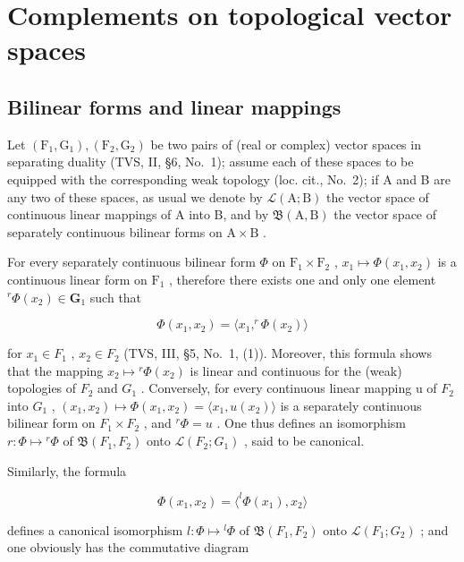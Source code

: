 \appendix
\chapter{Complements on topological vector spaces}

\section{Bilinear forms and linear mappings}

Let \((\mathrm{F}_{1},\mathrm{G}_{1}),(\mathrm{F}_{2},\mathrm{G}_{2})\) be two pairs of (real or complex) vector spaces in separating duality (TVS, II, §6, No.~1); assume each of these spaces to be equipped with the corresponding weak topology (loc. cit., No.~2); if A and B are any two of these spaces, as usual we denote by \(\mathcal{L}(\mathrm{A};\mathrm{B})\) the vector space of continuous linear mappings of A into B, and by \(\mathfrak{B}(\mathrm{A},\mathrm{B})\) the vector space of separately continuous bilinear forms on \(\mathrm{A}\times \mathrm{B}\) .

For every separately continuous bilinear form \(\Phi\) on \(\mathrm{F}_1\times \mathrm{F}_2\) , \(x_{1}\mapsto \Phi (x_{1},x_{2})\) is a continuous linear form on \(\mathrm{F}_1\) , therefore there exists one and only one element \(^r\Phi (x_2)\in \mathbf{G}_1\) such that

\[
\Phi (x _ {1}, x _ {2}) = \langle x _ {1}, ^ {r} \Phi (x _ {2}) \rangle\tag{1}
\]

for \(x_{1} \in F_{1}\) , \(x_{2} \in F_{2}\) (TVS, III, §5, No.~1, (1)). Moreover, this formula shows that the mapping \(x_{2} \mapsto {}^{r}\Phi(x_{2})\) is linear and continuous for the (weak) topologies of \(F_{2}\) and \(G_{1}\) . Conversely, for every continuous linear mapping u of \(F_{2}\) into \(G_{1}\) , \((x_{1}, x_{2}) \mapsto \Phi(x_{1}, x_{2}) = \langle x_{1}, u(x_{2}) \rangle\) is a separately continuous bilinear form on \(F_{1} \times F_{2}\) , and \(^{r}\Phi = u\) . One thus defines an isomorphism \(r : \Phi \mapsto {}^{r}\Phi\) of \(\mathfrak{B}(F_{1}, F_{2})\) onto \(\mathcal{L}(F_{2}; G_{1})\) , said to be canonical.

Similarly, the formula

\[
\Phi (x _ {1}, x _ {2}) = \langle^ {l} \Phi (x _ {1}), x _ {2} \rangle\tag{2}
\]

defines a canonical isomorphism \(l: \Phi \mapsto {}^{l} \Phi\) of \(\mathfrak{B}(F_{1}, F_{2})\) onto \(\mathcal{L}(F_{1}; G_{2})\) ; and one obviously has the commutative diagram

